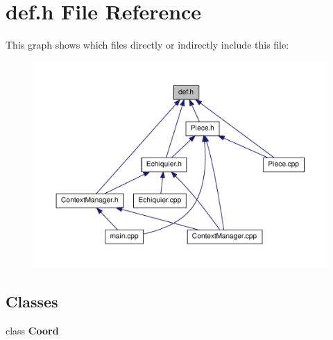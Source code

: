 \section{def.\-h \-File \-Reference}
\label{def_8h}
\-This graph shows which files directly or indirectly include this file\-:
\nopagebreak
\begin{figure}[H]
\begin{center}
\leavevmode
\includegraphics[width=350pt]{def_8h__dep__incl}
\end{center}
\end{figure}
\subsection*{\-Classes}
\begin{DoxyCompactItemize}
\item 
class {\bf \-Coord}
\end{DoxyCompactItemize}
